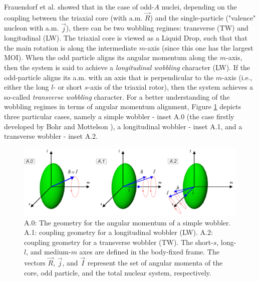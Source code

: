\documentclass[myclassdoc,debug]{rjparticle}
\begin{document}
Frauendorf et al. \cite{frauendorf2014transverse} showed that in the case of odd-$A$ nuclei, depending on the coupling between the triaxial core (with a.m. $\vec{R}$) and the single-particle ("valence" nucleon with a.m. $\vec{j}$), there can be two wobbling regimes: transverse (TW) and longitudinal (LW). The triaxial core is viewed as a Liquid Drop, such that that the main rotation is along the intermediate $m$-axis (since this one has the largest MOI). When the odd particle aligns its angular momentum along the $m$-axis, then the system is said to achieve a \emph{longitudinal wobbling} character (LW). If the odd-particle aligns its a.m. with an axis that is perpendicular to the $m$-axis (i.e., either the long $l$- or short $s$-axis of the triaxial rotor), then the system achieves a so-called \emph{transverse wobbling} character. For a better understanding of the wobbling regimes in terms of angular momentum alignment, Figure \ref{wobbling-coupling-scheme} depicts three particular cases, namely a simple wobbler - inset A.0 (the case firstly developed by Bohr and Mottelson \cite{bohr1998nuclear}), a longitudinal wobbler - inset A.1, and a transverse wobbler - inset A.2.
\begin{figure}
    \centering
    \includegraphics[scale=0.5]{figs/wobbling_Regimes_COUPLING_SCHEME.pdf}
    \caption{A.0: The geometry for the angular momentum of a simple wobbler. A.1: coupling geometry for a longitudinal wobbler (LW). A.2: coupling geometry for a transverse wobbler (TW). The short-$s$, long-$l$, and medium-$m$ axes are defined in the body-fixed frame. The vectors $\vec{R}$, $\vec{j}$, and $\vec{I}$ represent the set of angular momenta of the core, odd particle, and the total nuclear system, respectively.}
    \label{wobbling-coupling-scheme}
\end{figure}
\end{document}

